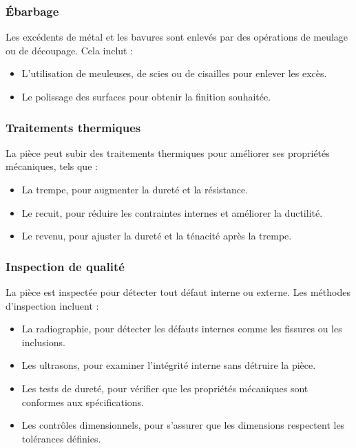 \documentclass[12pt]{article}
\begin{document}
\subsubsection{Ébarbage}
Les excédents de métal et les bavures sont enlevés par des opérations de meulage ou de découpage. Cela inclut :

\begin{itemize}
    \item L'utilisation de meuleuses, de scies ou de cisailles pour enlever les excès.
    \item Le polissage des surfaces pour obtenir la finition souhaitée.
\end{itemize}

\subsubsection{Traitements thermiques}
La pièce peut subir des traitements thermiques pour améliorer ses propriétés mécaniques, tels que :

\begin{itemize}
    \item La trempe, pour augmenter la dureté et la résistance.
    \item Le recuit, pour réduire les contraintes internes et améliorer la ductilité.
    \item Le revenu, pour ajuster la dureté et la ténacité après la trempe.
\end{itemize}

\subsubsection{Inspection de qualité}
La pièce est inspectée pour détecter tout défaut interne ou externe. Les méthodes d'inspection incluent :

\begin{itemize}
    \item La radiographie, pour détecter les défauts internes comme les fissures ou les inclusions.
    \item Les ultrasons, pour examiner l'intégrité interne sans détruire la pièce.
    \item Les tests de dureté, pour vérifier que les propriétés mécaniques sont conformes aux spécifications.
    \item Les contrôles dimensionnels, pour s'assurer que les dimensions respectent les tolérances définies.
\end{itemize}
\end{document}
